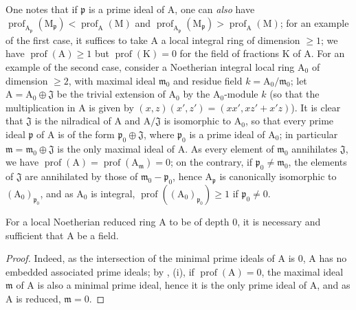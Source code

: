 \begin{env}[16.4.6.4]
\label{0.16.4.6.4}
One notes that if $\mathfrak{p}$ is a prime ideal of $\mathrm{A}$, one can \emph{also} have $\operatorname{prof}_{\mathrm{A}_\mathfrak{p}}(\mathrm{M}_\mathfrak{p})<\operatorname{prof}_\mathrm{A}(\mathrm{M})$ and $\operatorname{prof}_{\mathrm{A}_\mathfrak{p}}(\mathrm{M}_\mathfrak{p})>\operatorname{prof}_\mathrm{A}(\mathrm{M})$; for an example of the first case,
it suffices to take $\mathrm{A}$ a local integral ring of dimension $\geq 1$; we have $\operatorname{prof}(\mathrm{A})\geq 1$ but $\operatorname{prof}(\mathrm{K})=0$ for the field of fractions $\mathrm{K}$ of $\mathrm{A}$.
For an example of the second case, consider a Noetherian integral local ring $\mathrm{A}_0$ of dimension $\geq 2$, with maximal ideal $\mathfrak{m}_0$ and residue field $k=\mathrm{A}_0/\mathfrak{m}_0$; let $\mathrm{A}=\mathrm{A}_0\oplus\mathfrak{J}$ be the trivial extension of $\mathrm{A}_0$ by the $\mathrm{A}_0$-module $k$ (so that the multiplication in $\mathrm{A}$ is given by $(x,z)(x',z')=(xx',xz'+x'z)$).
It is clear that $\mathfrak{J}$ is the nilradical of $\mathrm{A}$ and $\mathrm{A}/\mathfrak{J}$ is isomorphic to $\mathrm{A}_0$, so that every prime ideal $\mathfrak{p}$ of $\mathrm{A}$ is of the form $\mathfrak{p}_0\oplus\mathfrak{J}$, where $\mathfrak{p}_0$ is a prime ideal of $\mathrm{A}_0$; in particular $\mathfrak{m}=\mathfrak{m}_0\oplus\mathfrak{J}$ is the only maximal ideal of $\mathrm{A}$.
As every element of $\mathfrak{m}_0$ annihilates $\mathfrak{J}$, we have $\operatorname{prof}(\mathrm{A})=\operatorname{prof}(\mathrm{A}_\mathfrak{m})=0$; on the contrary, if $\mathfrak{p}_0\neq\mathfrak{m}_0$, the elements of $\mathfrak{J}$ are annihilated by those of $\mathfrak{m}_0-\mathfrak{p}_0$, hence $\mathrm{A}_\mathfrak{p}$ is canonically isomorphic to $(\mathrm{A}_0)_{\mathfrak{p}_0}$, and as $\mathrm{A}_0$ is integral, $\operatorname{prof}((\mathrm{A}_0)_{\mathfrak{p}_0})\geq 1$ if $\mathfrak{p}_0\neq 0$.
\end{env}

\begin{corollary}[16.4.7]
\label{0.16.4.7}
For a local Noetherian reduced ring $\mathrm{A}$ to be of depth $0$, it is necessary and sufficient that $\mathrm{A}$ be a field.
\end{corollary}

\begin{proof}
Indeed, as the intersection of the minimal prime ideals of $\mathrm{A}$ is $0$, $\mathrm{A}$ has no embedded associated prime ideals; by , (i), if $\operatorname{prof}(\mathrm{A})=0$, the maximal ideal $\mathfrak{m}$ of $\mathrm{A}$ is also a minimal prime ideal, hence it is the only prime ideal of $\mathrm{A}$, and as $\mathrm{A}$ is reduced, $\mathfrak{m}=0$.
\end{proof}

